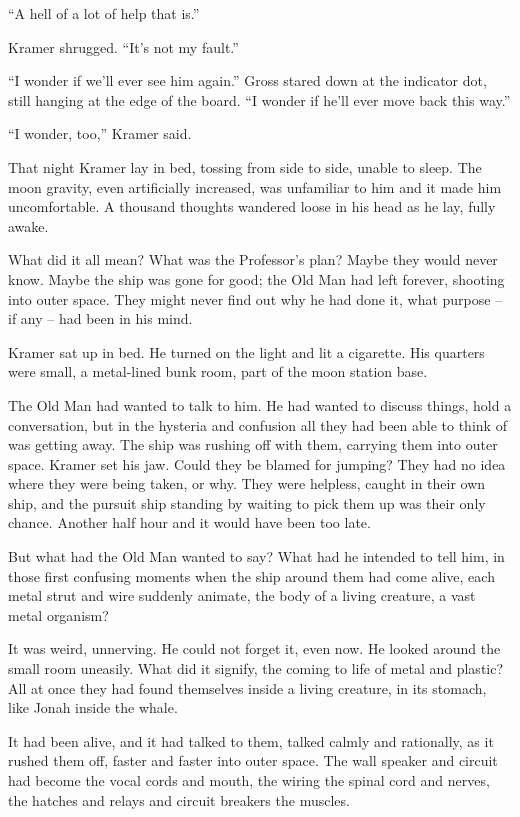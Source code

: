 \documentclass[12pt,a5paper]{book}
\newcommand{\storybreak}{%
  \par\vspace{0.6\baselineskip}
  \begin{center}\color{coveraccent}\small *\enspace *\enspace *\end{center}
  \vspace{0.3\baselineskip}\noindent\ignorespaces
}
\begin{document}
“A hell of a lot of help that is.”

Kramer shrugged. “It's not my fault.”

“I wonder if we'll ever see him again.” Gross stared down at the indicator dot, still hanging at the edge of the board. “I wonder if he'll ever move back this way.”

“I wonder, too,” Kramer said.

\storybreak
That night Kramer lay in bed, tossing from side to side, unable to sleep. The moon gravity, even artificially increased, was unfamiliar to him and it made him uncomfortable. A thousand thoughts wandered loose in his head as he lay, fully awake.

What did it all mean? What was the Professor's plan? Maybe they would never know. Maybe the ship was gone for good; the Old Man had left forever, shooting into outer space. They might never find out why he had done it, what purpose – if any – had been in his mind.

Kramer sat up in bed. He turned on the light and lit a cigarette. His quarters were small, a metal-lined bunk room, part of the moon station base.

The Old Man had wanted to talk to him. He had wanted to discuss things, hold a conversation, but in the hysteria and confusion all they had been able to think of was getting away. The ship was rushing off with them, carrying them into outer space. Kramer set his jaw. Could they be blamed for jumping? They had no idea where they were being taken, or why. They were helpless, caught in their own ship, and the pursuit ship standing by waiting to pick them up was their only chance. Another half hour and it would have been too late.

But what had the Old Man wanted to say? What had he intended to tell him, in those first confusing moments when the ship around them had come alive, each metal strut and wire suddenly animate, the body of a living creature, a vast metal organism?

It was weird, unnerving. He could not forget it, even now. He looked around the small room uneasily. What did it signify, the coming to life of metal and plastic? All at once they had found themselves inside a living creature, in its stomach, like Jonah inside the whale.

It had been alive, and it had talked to them, talked calmly and rationally, as it rushed them off, faster and faster into outer space. The wall speaker and circuit had become the vocal cords and mouth, the wiring the spinal cord and nerves, the hatches and relays and circuit breakers the muscles.
\end{document}
